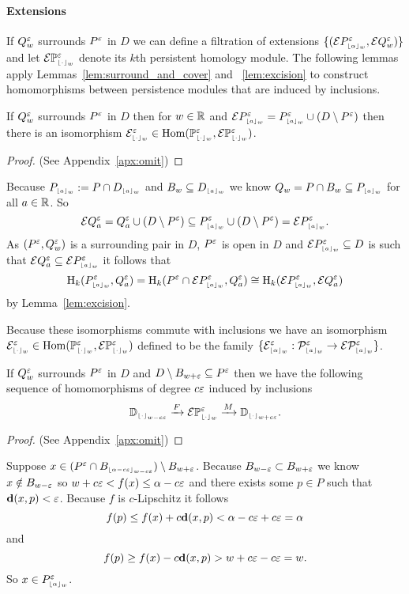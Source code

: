 \paragraph{Extensions}

If $Q_w^\e$ surrounds $P^\e$ in $D$ we can define a filtration of extensions $\{(\ext{P\subi{w}{\alpha}^\e},\ext{Q_w^\e})\}$ and let $\ext{\PP{w}{\e}}$ denote its $k$th persistent homology module.
The following lemmas apply Lemmas~\ref{lem:surround_and_cover} and ~\ref{lem:excision} to construct homomorphisms between persistence modules that are induced by inclusions.

\begin{lemma}\label{lem:extension_apply}
  If $Q_w^\e$ surrounds $P^\e$ in $D$ then for $w\in\R$ and $\ext{P\subi{w}{a}^\e} = P\subi{w}{a}^\e \cup (D\setminus P^\e)$ then there is an isomorphism $\E\subi{w}{\cdot}^\e \in \Hom(\PP{w}{\e},\ext{\PP{w}{\e}})$.
\end{lemma}\begin{proof}
  (See Appendix~\ref{apx:omit})
\end{proof}
\proofatend
  Because $P\subi{w}{a} := P\cap D\subi{w}{a}$ and $B_w\subseteq D\subi{w}{a}$ we know $Q_w = P\cap B_w \subseteq P\subi{w}{a}$ for all $a\in\R$.
  So
  \[\ext{Q^\e_a} = Q^\e_a\cup (D\setminus P^\e) \subseteq P\subi{w}{a}^\e \cup (D\setminus P^\e) = \ext{P\subi{w}{a}^\e}.\]
  As $(P^\e, Q_w^\e)$ is a surrounding pair in $D$, $P^\e$ is open in $D$ and $\ext{P\subi{w}{a}^\e}\subseteq D$ is such that $\ext{Q^\e_a}\subseteq \ext{P\subi{w}{a}^\e}$ it follows that
  \[\hom_k(P\subi{w}{a}^\e, Q^\e_a) = \hom_k(P^\e\cap \ext{P\subi{w}{a}^\e}, Q^\e_a) \cong\hom_k(\ext{P\subi{w}{a}^\e}, \ext{Q^\e_a})\]
  by Lemma~\ref{lem:excision}.

  Because these isomorphisms commute with inclusions we have an isomorphism $\E\subi{w}{\cdot}^\e \in \Hom(\PP{w}{\e},\ext{\PP{w}{\e}})$ defined to be the family $\{\E\subi{w}{\alpha}^\e : \P{w}{\e}{a}\to \E\P{w}{\e}{a}\}$.
\endproofatend

\begin{lemma}\label{lem:p_interleave}
 If $Q_w^\e$ surrounds $P^\e$ in $D$ and $D\setminus B_{w + \e}\subseteq P^\e$ then we have the following sequence of homomorphisms of degree $c\e$ induced by inclusions
 \[\DD{w-c\e}\xrightarrow{F}\E\PP{w}{\e}\xrightarrow{M}\DD{w+c\e}.\]
\end{lemma}
\begin{proof}
  (See Appendix~\ref{apx:omit})
\end{proof}
\proofatend
  Suppose $x\in (P^\e\cap B\subi{w-c\e}{\alpha-c\e})\setminus B_{w+\e}$.
  Because $B_{w-\e}\subset B_{w+\e}$ we know $x\notin B_{w-\e}$ so $w+c\e < f(x)\leq \alpha-c\e$ and there exists some $p\in P$ such that $\dist(x, p) < \e$.
  Because $f$ is $c$-Lipschitz it follows
  \[ f(p)\leq f(x) + c\dist(x, p) < \alpha - c\e + c\e = \alpha\]
  and
  \[ f(p)\geq f(x) - c\dist(x, p) > w+c\e-c\e = w.\]
  So $x\in P\subi{w}{\alpha}^\e$.

